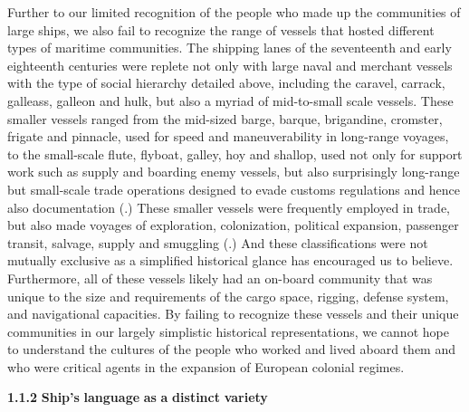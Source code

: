 \begin{styleNormali}
Further to our limited recognition of the people who made up the communities of large ships, we also fail to recognize the range of vessels that hosted different types of maritime communities. The shipping lanes of the seventeenth and early eighteenth centuries were replete not only with large naval and merchant vessels with the type of social hierarchy detailed above, including the caravel, carrack, galleass, galleon and hulk, but also a myriad of mid-to-small scale vessels. These smaller vessels ranged from the mid-sized barge, barque, brigandine, cromster, frigate and pinnacle, used for speed and maneuverability in long-range voyages, to the small-scale flute, flyboat, galley, hoy and shallop, used not only for support work such as supply and boarding enemy vessels, but also surprisingly long-range but small-scale trade operations designed to evade customs regulations and hence also documentation (\citealt{Bicheno2012}.) These smaller vessels were frequently employed in trade, but also made voyages of exploration, colonization, political expansion, passenger transit, salvage, supply and smuggling (\citealt{Jarvis2010}.) And these classifications were not mutually exclusive as a simplified historical glance has encouraged us to believe. Furthermore, all of these vessels likely had an on-board community that was unique to the size and requirements of the cargo space, rigging, defense system, and navigational capacities. By failing to recognize these vessels and their unique communities in our largely simplistic historical representations, we cannot hope to understand the cultures of the people who worked and lived aboard them and who were critical agents in the expansion of European colonial regimes. 
\end{styleNormali}

\begin{styleNormali}
\textbf{1.1.2} \textbf{Ship’s} \textbf{language} \textbf{as} \textbf{a} \textbf{distinct} \textbf{variety}
\end{styleNormali}

